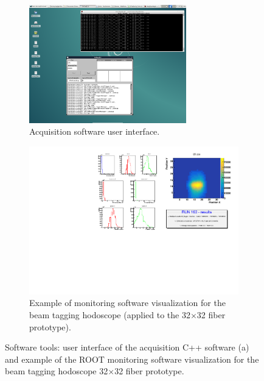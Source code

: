 \begin{figure}
\begin{subfigure}[t]{.5\textwidth}
\centering
\includegraphics[width=0.75\textwidth]{03_GraphicFiles/chapter3_CLaRySproto/Electronics_Acquisition/DAQsoft.png}
\caption{Acquisition software user interface.}
\label{chap3::fig::daqSoftware}
\end{subfigure}
\begin{subfigure}[t]{.5\textwidth}
\centering
\includegraphics[width=1\textwidth]{03_GraphicFiles/chapter3_CLaRySproto/Electronics_Acquisition/monitoringEx.pdf}
\caption{Example of monitoring software visualization for the beam tagging hodoscope (applied to the 32$\times$32 fiber prototype).}
\label{chap3::fig::monitoringSoftware}
\end{subfigure}
\caption{Software tools: user interface of the acquisition C++ software (a) and example of the ROOT monitoring software visualization for the beam tagging hodoscope 32$\times$32 fiber prototype.}
\label{chap3::fig::SoftwareAll}
\end{figure}

